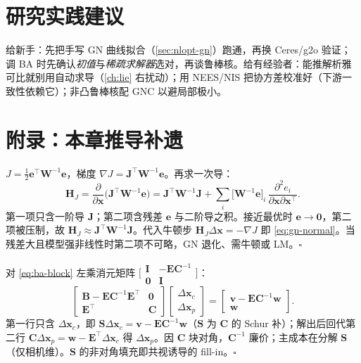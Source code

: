 \section*{研究实践建议}
给新手：先把手写 GN 曲线拟合（\cref{sec:nlopt-gn}）跑通，再换 Ceres/g2o 验证；调 BA 时先确认\emph{初值}与\emph{稀疏求解器}选对，再谈鲁棒核。给有经验者：能推解析雅可比就别用自动求导（\cref{ch:lie} 右扰动）；用 NEES/NIS 把协方差校准好（下游一致性依赖它）；非凸鲁棒核配 GNC 以避局部极小。

\section*{附录：本章推导补遗}
\label{sec:nlopt-appendix}

\begin{derivation}
$J=\tfrac12\mathbf{e}^\top\mathbf{W}^{-1}\mathbf{e}$，梯度 $\nabla J=\mathbf{J}^\top\mathbf{W}^{-1}\mathbf{e}$。再求一次导：
\[
  \mathbf{H}_J=\frac{\partial}{\partial\mathbf{x}}\big(\mathbf{J}^\top\mathbf{W}^{-1}\mathbf{e}\big)
  =\mathbf{J}^\top\mathbf{W}^{-1}\mathbf{J}+\sum_i\big[\mathbf{W}^{-1}\mathbf{e}\big]_i\,\frac{\partial^2 e_i}{\partial\mathbf{x}\partial\mathbf{x}^\top}.
\]
第一项只含一阶导 $\mathbf{J}$；第二项含残差 $\mathbf{e}$ 与二阶导之积。接近最优时 $\mathbf{e}\to\mathbf{0}$，第二项被压制，故 $\mathbf{H}_J\approx\mathbf{J}^\top\mathbf{W}^{-1}\mathbf{J}$。代入牛顿步 $\mathbf{H}_J\Delta\mathbf{x}=-\nabla J$ 即 \cref{eq:gn-normal}。当残差大且模型强非线性时第二项不可略，GN 退化、需牛顿或 LM。\hfill$\square$
\end{derivation}

\begin{derivation}
对 \cref{eq:ba-block} 左乘消元矩阵 $\big[\begin{smallmatrix}\mathbf{I}&-\mathbf{E}\mathbf{C}^{-1}\\\mathbf{0}&\mathbf{I}\end{smallmatrix}\big]$：
\[
  \begin{bmatrix}\mathbf{B}-\mathbf{E}\mathbf{C}^{-1}\mathbf{E}^\top&\mathbf{0}\\\mathbf{E}^\top&\mathbf{C}\end{bmatrix}
  \begin{bmatrix}\Delta\mathbf{x}_c\\\Delta\mathbf{x}_p\end{bmatrix}
  =\begin{bmatrix}\mathbf{v}-\mathbf{E}\mathbf{C}^{-1}\mathbf{w}\\\mathbf{w}\end{bmatrix}.
\]
第一行只含 $\Delta\mathbf{x}_c$，即 $\mathbf{S}\Delta\mathbf{x}_c=\mathbf{v}-\mathbf{E}\mathbf{C}^{-1}\mathbf{w}$（$\mathbf{S}$ 为 $\mathbf{C}$ 的 Schur 补）；解出后回代第二行 $\mathbf{C}\Delta\mathbf{x}_p=\mathbf{w}-\mathbf{E}^\top\Delta\mathbf{x}_c$ 得 $\Delta\mathbf{x}_p$。因 $\mathbf{C}$ 块对角，$\mathbf{C}^{-1}$ 廉价；主成本在分解 $\mathbf{S}$（仅相机维）。$\mathbf{S}$ 的非对角填充即共视诱导的 fill-in。\hfill$\square$
\end{derivation}

